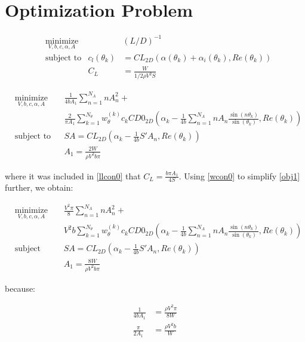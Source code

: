 \documentclass[letterpaper,12pt]{article}
\begin{document}
\section{Optimization Problem}

\begin{align}
	& \underset{V, b, c, \alpha, A}{\text{minimize}}
	& & \left( L / D\right)^{-1} \nonumber \\
	& \text{subject to} &  \label{llcon0}
	c_l(\theta_k) &= CL_{2D} \left( \alpha(\theta_k) + \alpha_i(\theta_k), Re(\theta_k)\right) \\
	& &  \label{wcon0} C_L &= \frac{W}{1/2 \rho V^2 S}
\end{align}


\begin{align}
	& \underset{V, b, c, \alpha, A}{\text{minimize}}
	& & \frac {1}{4bA_1} \sum_{n=1}^{N_A} n A_{n}^2 + \nonumber \\
	&&& \frac 2 {\pi A_1} \sum_{k=1}^{N_{\theta}} w_{\theta}^{(k)} c_k CD0_{2D}\left( 
		\alpha_k - 
		\frac {1}{4b} \sum_{n=1}^{N_A} n A_n \frac{ \sin(n\theta_k) }{\sin(\theta_k)} , Re(\theta_k)
		\right) \label{obj1} \\
	& \text{subject to}
	& & SA = CL_{2D} \left( \alpha_k - \frac {1}{4b} S' A_n , Re(\theta_k)\right)  \label{llcon1}\\
	& &  & A_1 = \frac{2W}{\rho V^2 b \pi} \label{wcon1}
\end{align}

where it was included in \ref{llcon0} that $C_L = \frac{b \pi A_1}{4S}$.
Using \ref{wcon0} to simplify \ref{obj1} further, we obtain:

\begin{align}
	& \underset{V, b, c, \alpha, A}{\text{minimize}}
	& & \frac{V^2 \pi}{8}\sum_{n=1}^{N_A} n A_{n}^2 + \nonumber \\
	&&&  V^2 b  \sum_{k=1}^{N_{\theta}} w_{\theta}^{(k)} c_k CD0_{2D}\left( 
		\alpha_k - 
		\frac {1}{4b} \sum_{n=1}^{N_A} n A_n \frac{ \sin(n\theta_k) }{\sin(\theta_k)} , Re(\theta_k)
		\right) \label{obj1} \\
	& \text{subject to}
	& & SA = CL_{2D} \left( \alpha_k - \frac {1}{4b} S' A_n , Re(\theta_k)\right)  \label{llcon1}\\
	& &  & A_1 = \frac{8W}{\rho V^2 b \pi} \label{wcon1}
\end{align}

because:

\begin{align*}
	\frac{1}{4bA_1} &= \frac{\rho V^2 \pi}{8W} \\
	\frac{\pi}{2A_1} &= \frac{\rho V^2 b}{ W} 
\end{align*}
\end{document}
